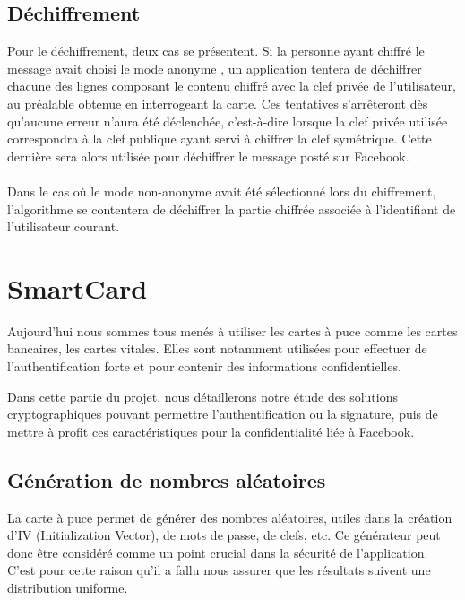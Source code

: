 \documentclass[a4paper,11pt,french]{article}
\begin{document}

\subsection{Déchiffrement}
Pour le déchiffrement, deux cas se présentent. Si la personne ayant chiffré le
message avait choisi le mode \og anonyme \fg{}, un application tentera de 
déchiffrer chacune des lignes composant le contenu chiffré avec la clef privée 
de l'utilisateur, au préalable obtenue en interrogeant la carte. Ces tentatives
s'arrêteront dès qu'aucune erreur n'aura été déclenchée, c'est-à-dire lorsque la
clef privée utilisée correspondra à la clef publique ayant servi à chiffrer la 
clef symétrique. Cette dernière sera alors utilisée pour déchiffrer le message 
posté sur Facebook.

\paragraph{}
Dans le cas où le mode \og non-anonyme \fg{} avait été sélectionné lors du
chiffrement, l'algorithme se contentera de déchiffrer la partie chiffrée
associée à l'identifiant de l'utilisateur courant.


\section{SmartCard}
Aujourd'hui nous sommes tous menés à utiliser les cartes à puce comme les cartes
bancaires, les cartes vitales. Elles sont notamment utilisées pour effectuer de 
l'authentification forte et pour contenir des informations confidentielles.

Dans cette partie du projet, nous détaillerons notre étude des solutions 
cryptographiques pouvant permettre l'authentification ou la signature, puis de 
mettre à profit ces caractéristiques pour la confidentialité liée à Facebook.


\subsection{Génération de nombres aléatoires}
La carte à puce permet de générer des nombres aléatoires, utiles dans la création
d'IV (Initialization Vector), de mots de passe, de clefs, etc. Ce générateur 
peut donc être considéré comme un point crucial dans la sécurité de l'application.
C'est pour cette raison qu'il a fallu nous assurer que les résultats suivent une
distribution uniforme. 
\end{document}
